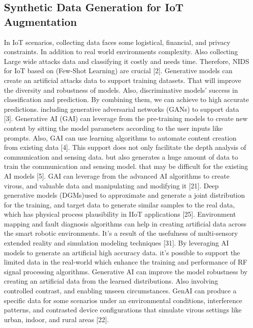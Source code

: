 \documentclass[journal]{IEEEtran}
\begin{document}
\subsection{Synthetic Data Generation for IoT Augmentation}
In IoT scenarios, collecting data faces some logistical, financial, and privacy constraints. In addition to real world environments complexity. Also collecting Large wide attacks data and classifying it costly and needs time. Therefore, NIDS for IoT based on (Few-Shot Learning) are crucial [2]. Generative models can create an artificial attacks data to support training datasets. That will improve the diversity and robustness of models. Also, discriminative models’ success in classification and prediction. By combining them, we can achieve to high accurate predictions. including generative adversarial networks (GANs) to support data [3].
Generative AI (GAI) can leverage from the pre-training models to create new content by sitting the model parameters according to the user inputs like prompts. Also, GAI can use learning algorithms to automate content creation from existing data [4]. This support does not only facilitate the depth analysis of communication and sensing data. but also generates a huge amount of data to train the communication and sensing model. that may be difficult for the existing AI models [5]. GAI can leverage from the advanced AI algorithms to create virous, and valuable data and manipulating and modifying it [21]. Deep generative models (DGMs)used to approximate and generate a joint distribution for the training, and target data to generate similar samples to the real data, which has physical process plausibility in IIoT applications [25].
Environment mapping and fault diagnosis algorithms can help in creating artificial data across the smart robotic environments. It’s a result of the usefulness of multi-sensory extended reality and simulation modeling techniques [31]. By leveraging AI models to generate an artificial high accuracy data. it’s possible to support the limited data in the real-world which enhance the training and performance of RF signal processing algorithms. Generative AI can improve the model robustness by creating an artificial data from the learned distributions. Also involving controlled contrast, and enabling unseen circumstances. GenAI can produce a specific data for some scenarios under an environmental conditions, interference patterns, and contrasted device configurations that simulate virous settings like urban, indoor, and rural areas [22].
\end{document}
